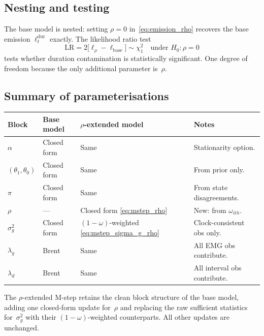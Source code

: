 \documentclass[12pt]{article}
\begin{document}
\subsection{Nesting and testing}

The base model is nested: setting \(\rho = 0\) in~\eqref{eq:emission_rho} recovers the base emission \(\ell^{\mathrm{dur}}_t\) exactly. The likelihood ratio test
\[
\mathrm{LR} = 2\big[\ell_{\rho} - \ell_{\text{base}}\big] \sim \chi^2_1 \quad \text{under } H_0: \rho = 0
\]
tests whether duration contamination is statistically significant. One degree of freedom because the only additional parameter is~\(\rho\).

\subsection{Summary of parameterisations}

\begin{center}
\begin{tabular}{llll}
\toprule
Block & Base model & \(\rho\)-extended model & Notes \\
\midrule
\(\alpha\) & Closed form & Same & Stationarity option. \\
\((\theta_1, \theta_0)\) & Closed form & Same & From prior only. \\
\(\pi\) & Closed form & Same & From state disagreements. \\
\(\rho\) & --- & Closed form \eqref{eq:mstep_rho} & New: from \(\omega_{ith}\). \\
\(\sigma^2_g\) & Closed form & \((1-\omega)\)-weighted \eqref{eq:mstep_sigma_g_rho} & Clock-consistent obs only. \\
\(\lambda_g\) & Brent & Same & All EMG obs contribute. \\
\(\lambda_d\) & Brent & Same & All interval obs contribute. \\
\bottomrule
\end{tabular}
\end{center}

The \(\rho\)-extended M-step retains the clean block structure of the base model, adding one closed-form update for~\(\rho\) and replacing the raw sufficient statistics for~\(\sigma^2_g\) with their \((1-\omega)\)-weighted counterparts. All other updates are unchanged.
\end{document}
